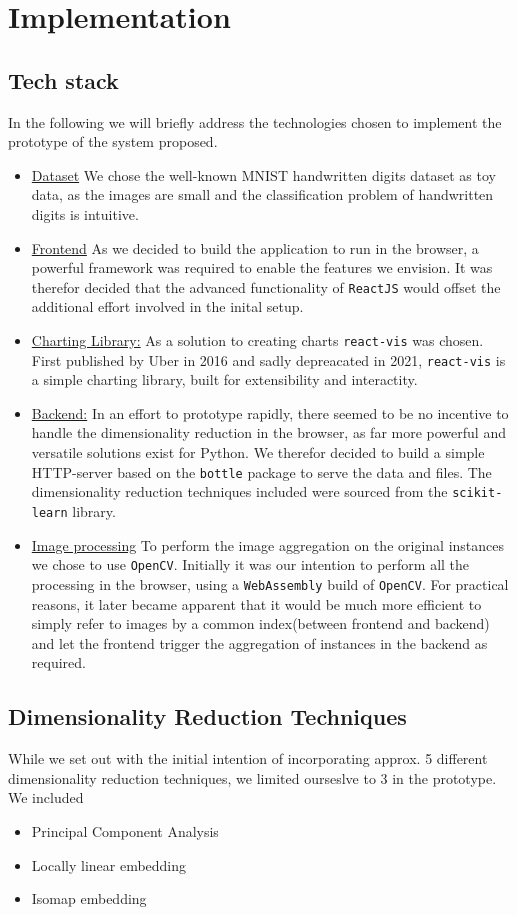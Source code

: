 \documentclass[11pt,a4paper]{article}
\begin{document}
  \section {Implementation}
  \subsection{Tech stack}
    In the following we will briefly address the technologies chosen to implement the prototype of the system proposed.
    
    \begin{itemize}
      \item \underline{Dataset} We chose the well-known MNIST handwritten digits dataset as toy data, as the images are small and the classification problem of handwritten digits is intuitive.
      \item \underline{Frontend} As we decided to build the application to run in the browser, a powerful framework was required to enable the features we envision. It was therefor decided that the advanced functionality of \texttt{ReactJS} would offset the additional effort involved in the inital setup. 
      \item \underline{Charting Library:} As a solution to creating charts \texttt{react-vis} was chosen. First published by Uber in 2016 and sadly depreacated in 2021, \texttt{react-vis} is a simple charting library, built for extensibility and interactity.
      \item \underline{Backend:} In an effort to prototype rapidly, there seemed to be no incentive to handle the dimensionality reduction in the browser, as far more powerful and versatile solutions exist for Python. We therefor decided to build a simple HTTP-server based on the \texttt{bottle} package to serve the data and files. The dimensionality reduction techniques included were sourced from the \texttt{scikit-learn} library.
      \item \underline{Image processing} To perform the image aggregation on the original instances we chose to use \texttt{OpenCV}. Initially it was our intention to perform all the processing in the browser, using a \texttt{WebAssembly} build of \texttt{OpenCV}. 
      For practical reasons, it later became apparent that it would be much more efficient to simply refer to images by a common index(between frontend and backend) and let the frontend trigger the aggregation of instances in the backend as required. 
    \end{itemize}
  \subsection{Dimensionality Reduction Techniques}
    While we set out with the initial intention of incorporating approx. 5 different dimensionality reduction techniques, we limited ourseslve to 3 in the prototype. We included \begin{itemize}
      \item Principal Component Analysis
      \item Locally linear embedding
      \item Isomap embedding
    \end{itemize}
\end{document}
